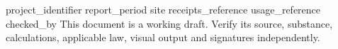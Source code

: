 \documentclass[11pt,a4paper]{article}
\begin{document}
{{project_identifier}}
{{report_period}}
{{site}}
{{receipts_reference}}
{{usage_reference}}
{{checked_by}}
This document is a working draft. Verify its source, substance, calculations, applicable law, visual output and signatures independently.
\end{document}
